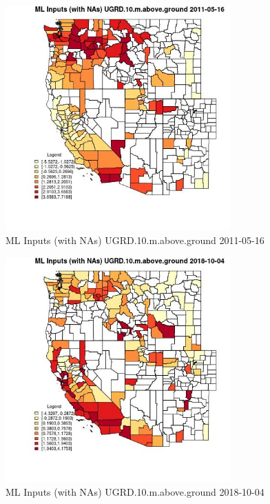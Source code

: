 \begin{figure} 
\centering  
\includegraphics[width=0.77\textwidth]{Code_Outputs/Report_ML_input_PM25_Step4_part_f_de_duplicated_aves_prioritize_24hr_obswNAs_CountyUGRD10mabovegroundMean2011-05-16.jpg} 
\caption{\label{fig:Report_ML_input_PM25_Step4_part_f_de_duplicated_aves_prioritize_24hr_obswNAsCountyUGRD10mabovegroundMean2011-05-16}ML Inputs (with NAs) UGRD.10.m.above.ground 2011-05-16} 
\end{figure} 
 

\begin{figure} 
\centering  
\includegraphics[width=0.77\textwidth]{Code_Outputs/Report_ML_input_PM25_Step4_part_f_de_duplicated_aves_prioritize_24hr_obswNAs_CountyUGRD10mabovegroundMean2018-10-04.jpg} 
\caption{\label{fig:Report_ML_input_PM25_Step4_part_f_de_duplicated_aves_prioritize_24hr_obswNAsCountyUGRD10mabovegroundMean2018-10-04}ML Inputs (with NAs) UGRD.10.m.above.ground 2018-10-04} 
\end{figure} 
 

